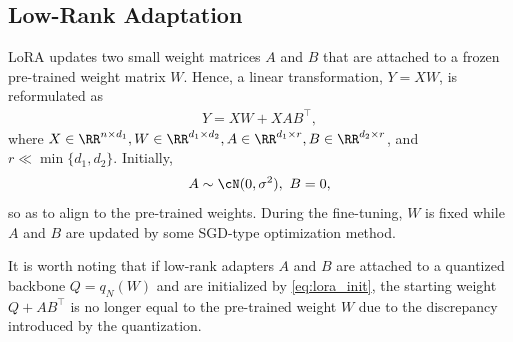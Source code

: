 \subsection{Low-Rank Adaptation}
\label{sec:background_lora}
LoRA \citep{hu2021lora} updates two small weight matrices $A$ and $B$ that are attached to a frozen pre-trained weight matrix $W$. Hence, a linear transformation, $Y = XW$, is reformulated as
\begin{align}
\label{eq:lora}
    Y = XW + XAB^{\top},
\end{align}
where $X \in \RR^{n \times d_1}, W \in \RR^{d_1 \times d_2}, A \in \RR^{d_1 \times r}, B \in \RR^{d_2 \times r}$, and $r \ll \min\{d_1, d_2\}$. Initially, 
\begin{align}
\label{eq:lora_init}
    A \sim \cN (0, \sigma^2), ~ B = 0,
\end{align}
so as to align to the pre-trained weights. During the fine-tuning, $W$ is fixed while $A$ and $B$ are updated by some SGD-type optimization method.

It is worth noting that if low-rank adapters $A$ and $B$ are attached to a quantized backbone $Q=q_N(W)$ and are initialized by \eqref{eq:lora_init}, the starting weight $Q + AB^{\top}$ is no longer equal to the pre-trained weight $W$ due to the discrepancy introduced by the quantization. 
